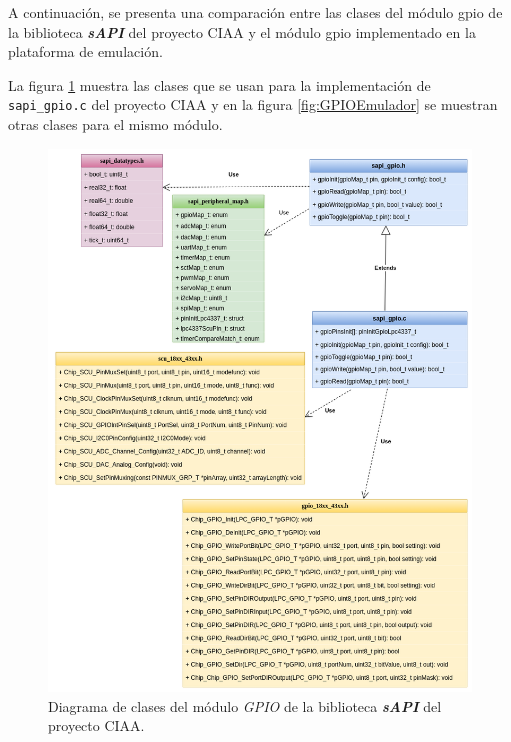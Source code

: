 A continuación, se presenta una comparación entre las clases del módulo gpio de la biblioteca \textit{\textbf{sAPI}} del proyecto CIAA y el módulo gpio implementado en la plataforma de emulación. 

La figura \ref{fig:GPIOsAPI} muestra las clases que se usan para la implementación de \newline \texttt{sapi\_gpio.c} del proyecto CIAA y en la figura \ref{fig:GPIOEmulador} se muestran otras clases para el mismo módulo.

\hfill \break
\hfill \break
\hfill \break
\hfill \break
\hfill \break
\hfill \break
\hfill \break
\hfill \break
\hfill \break
\hfill \break
\hfill \break
\hfill \break
\hfill \break

\begin{figure}[ht]
	\centering
	\includegraphics[scale=.41]{./Figures/DiagramaClasesGPIOsAPI.png}
	\caption{Diagrama de clases del módulo \textit{GPIO} de la biblioteca \textit{\textbf{sAPI}} del proyecto CIAA.}
	\label{fig:GPIOsAPI}
\end{figure}


